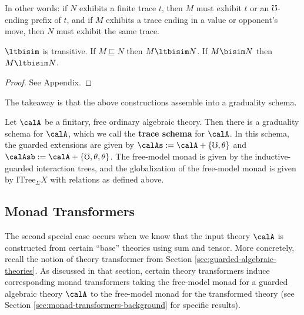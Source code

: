 \documentclass[acmsmall,screen,review,anonymous]{acmart}
\theoremstyle{remark}
\begin{document}
In other words: if $N$ exhibits a finite trace $t$, then $M$ must exhibit $t$
or an $\mho$-ending prefix of $t$, and if $M$ exhibits a trace ending in a value
or opponent's move, then $N$ must exhibit the same trace.


\begin{theorem}\label{thm:itrees-ext-ord}
  $\ltbisim$ is transitive.
  If $M \sqsubseteq N$ then $M \ltbisim N$.
  If $M \bisim N$ then $M \ltbisim N$.
\end{theorem}
\begin{proof}
  See Appendix.
\end{proof}

The takeaway is that the above constructions assemble into a graduality schema.
%
\begin{definition}\label{def:gs-free-theory}
  Let $\calA$ be a finitary, free ordinary algebraic theory. Then there is a
  graduality schema for $\calA$, which we call the \textbf{trace schema} for $\calA$.
  In this schema, the guarded extensions are given by $\calAs := \calA + \{
  \mho, \theta \}$ and $\calAsb := \calA + \{ \mho, \theta, \theta \}$. The
  free-model monad is given by the inductive-guarded interaction trees, and the
  globalization of the free-model monad is given by $\textrm{ITree}_\Sigma X$
  with relations as defined above.
\end{definition}


\subsection{Monad Transformers}\label{sec:monad-transformers}

The second special case occurs when we know that the input theory $\calA$ is
constructed from certain ``base'' theories using sum and tensor. More
concretely, recall the notion of theory transformer from Section
\ref{sec:guarded-algebraic-theories}. As discussed in that section, certain
theory transformers induce corresponding monad transformers taking the
free-model monad for a guarded algebraic theory $\calA$ to the free-model monad
for the transformed theory (see Section \ref{sec:monad-transformers-background}
for specific results).
\end{document}
